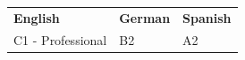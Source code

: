 
\begin{tabularx}{\textwidth}{
>{\raggedright\arraybackslash}X
>{\raggedright\arraybackslash}X
>{\raggedright\arraybackslash}X
}

\textbf{English} &
\textbf{German} &
\textbf{Spanish} \\

C1 - Professional &
B2 &
A2\\

\end{tabularx}
